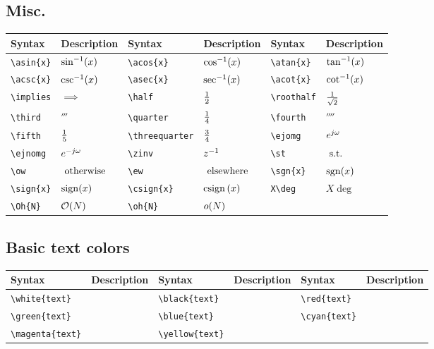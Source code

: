 \documentclass{article}
\begin{document}
	\subsection{Misc.}
	\begin{table}[H]
		\begin{tabular}{|l|l|l|l|l|l|}
			\hline
			Syntax	&	Description	&	Syntax	&	Description	&	Syntax	&	Description	 \\
			\hline
			\verb|\asin{x}|	&	$\sin^{-1}(x)$	&	\verb|\acos{x}|	&	$\cos^{-1}(x)$	&	\verb|\atan{x}|	&	$\tan^{-1}(x)$ \\	
			\verb|\acsc{x}|	&	$\csc^{-1}(x)$	&	\verb|\asec{x}|	&	$\sec^{-1}(x)$	&	\verb|\acot{x}|	&	$\cot^{-1}(x)$ \\
			\verb|\implies|	&	$\implies$	&	\verb|\half|	&	$\frac{1}{2}$	&	\verb|\roothalf|	&	$\frac{1}{\sqrt{2}}$ \\
			\verb|\third|	&	$\third$	&	\verb|\quarter|	&	$\frac{1}{4}$	&	\verb|\fourth|	&	$\fourth$ \\
			\verb|\fifth|	&	$\frac{1}{5}$	&	\verb|\threequarter|	&	$\frac{3}{4}$	&	\verb|\ejomg|	&	$e^{j\omega}$ \\
			\verb|\ejnomg|	&	$e^{-j\omega}$	&	\verb|\zinv|	&	$z^{-1}$	&	\verb|\st|	&	$~\mathrm{s.t.}~$ \\
			\verb|\ow|	&	$~\mathrm{otherwise}~$	&	\verb|\ew|	&	$~\mathrm{elsewhere}~$	&	\verb|\sgn{x}|	&	$\mathrm{sgn}(x)$ \\
			\verb|\sign{x}|	&	$\mathrm{sign}(x)$	&	\verb|\csign{x}|	&	$\mathrm{csign}\left(x\right)$ & \verb|X\deg|	&	$X\deg$	\\
			\verb|\Oh{N}|	&	$\mathcal{O}(N)$	&	\verb|\oh{N}|	&	$o(N)$	&		&	 \\
			\hline	
		\end{tabular}
	\end{table}

	\subsection{Basic text colors}
	\begin{table}[H]
		\begin{tabular}{|l|l|l|l|l|l|}
			\hline
			Syntax	&	Description	&	Syntax	&	Description	&	Syntax	&	Description	 \\
			\hline
			\verb|\white{text}|	&	\white{text}	&	\verb|\black{text}|	&	\black{text}	&	\verb|\red{text}|	&	\red{text} \\	
			\verb|\green{text}|	&	\green{text}	&	\verb|\blue{text}|	&	\blue{text}	&	\verb|\cyan{text}|	&	\cyan{text} \\
			\verb|\magenta{text}|	&	\magenta{text}	&	\verb|\yellow{text}|	&	\yellow{text}	&		&	 \\
			\hline	
		\end{tabular}
	\end{table}
\end{document}
